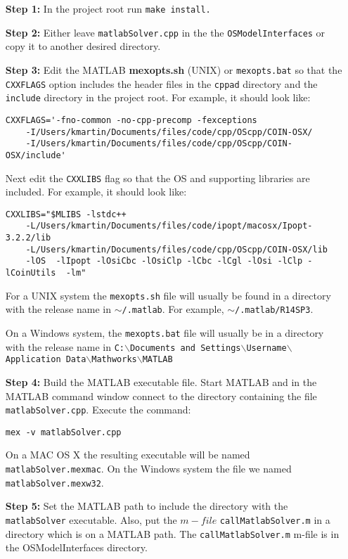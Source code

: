 \documentclass[11pt]{article}
\renewcommand{\_}{{\char"5F}}
\renewcommand{\{}{{\char"7B}}
\renewcommand{\}}{{\char"7D}}
\renewcommand{\^}{{\char"0D}}
\renewcommand{\'}{{\char"0D}}
\begin{document}
\begin{itemize}


\item[{\bf Step  1:}] In the project root run {\tt make install.}

\item[{\bf Step  2:}]   Either leave {\tt matlabSolver.cpp} in the  the {\tt OSModelInterfaces} or copy it to another desired directory.

\item[{\bf Step 3:}] Edit the MATLAB  {\bf mexopts.sh} (UNIX) or {\tt mexopts.bat}  so that the {\tt CXXFLAGS} option includes the header files in the {\tt cppad} directory and the {\tt include} directory in the project root. For example, it  should look like:
\begin{verbatim}
CXXFLAGS='-fno-common -no-cpp-precomp -fexceptions
    -I/Users/kmartin/Documents/files/code/cpp/OScpp/COIN-OSX/   
    -I/Users/kmartin/Documents/files/code/cpp/OScpp/COIN-OSX/include'
\end{verbatim}

Next edit the {\tt CXXLIBS} flag so that the OS and supporting libraries are included. For example, it should look like:

\begin{verbatim}
CXXLIBS="$MLIBS -lstdc++     
    -L/Users/kmartin/Documents/files/code/ipopt/macosx/Ipopt-3.2.2/lib   
    -L/Users/kmartin/Documents/files/code/cpp/OScpp/COIN-OSX/lib     
    -lOS  -lIpopt -lOsiCbc -lOsiClp -lCbc -lCgl -lOsi -lClp -lCoinUtils  -lm"
\end{verbatim}

For a UNIX system the {\tt mexopts.sh} file will usually be found in a directory with the release name in {\tt  $\sim$/.matlab}. For example, 
{\tt $\sim$/.matlab/R14SP3}.


On a Windows system, the {\tt  mexopts.bat} file will usually be in a directory with the release name in {\tt C:$\backslash$Documents and Settings$\backslash$Username$\backslash$Application Data$\backslash$Mathworks$\backslash$MATLAB}


\item[{\bf Step 4:}]  Build the MATLAB executable file. Start MATLAB and in the MATLAB command window connect to the directory containing the file {\tt matlabSolver.cpp}.  Execute the command:

\begin{verbatim}
mex -v matlabSolver.cpp
\end{verbatim}

On a MAC OS X the resulting executable will be named {\tt matlabSolver.mexmac}. On the Windows system the file we named {\tt matlabSolver.mexw32}.

\item[{\bf Step 5:}]  Set the MATLAB path to include the directory with the {\tt matlabSolver} executable. Also, put  the $m-file$ {\tt callMatlabSolver.m} in a directory which is on a MATLAB path.  The  {\tt callMatlabSolver.m} m-file is in the OSModelInterfaces directory. 

\end{itemize}
\end{document}
